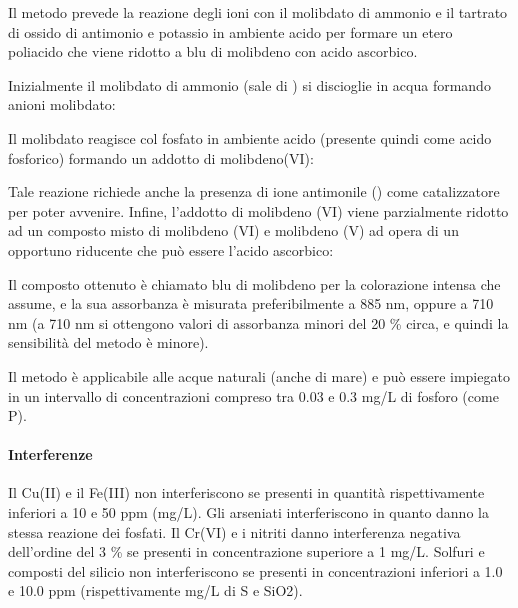 Il metodo prevede la reazione degli ioni  con il molibdato di ammonio e il tartrato di ossido di antimonio e potassio in ambiente acido per formare un etero poliacido che viene ridotto a blu di molibdeno con acido ascorbico.

Inizialmente il molibdato di ammonio (sale di ) si discioglie in acqua formando anioni molibdato:
\begin{center}
\end{center}

Il molibdato reagisce col fosfato in ambiente acido (presente quindi come acido fosforico) formando un addotto di molibdeno(VI):
\begin{center}
\end{center}

Tale reazione richiede anche la presenza di ione antimonile () come catalizzatore per poter avvenire. Infine, l'addotto di molibdeno (VI) viene parzialmente ridotto ad un composto misto di molibdeno (VI) e molibdeno (V) ad opera di un opportuno riducente che può essere l'acido ascorbico:
\begin{center}
\end{center}

Il composto ottenuto è chiamato blu di molibdeno per la colorazione intensa che assume, e la sua assorbanza è misurata preferibilmente a 885 nm, oppure a 710 nm (a 710 nm si ottengono valori di assorbanza minori del 20 \% circa, e quindi la sensibilità del metodo è minore).

Il metodo è applicabile alle acque naturali (anche di mare) e può essere impiegato in un intervallo di concentrazioni compreso tra 0.03 e 0.3 mg/L di fosforo (come P).

\paragraph{Interferenze}

Il Cu(II) e il Fe(III) non interferiscono se presenti in quantità rispettivamente inferiori a 10 e 50 ppm (mg/L). Gli arseniati interferiscono in quanto danno la stessa reazione dei fosfati. Il Cr(VI) e i nitriti danno interferenza negativa dell'ordine del 3 \% se presenti in concentrazione superiore a 1 mg/L. Solfuri e composti del silicio non interferiscono se presenti in concentrazioni inferiori a 1.0 e 10.0 ppm (rispettivamente mg/L di S e SiO2).

